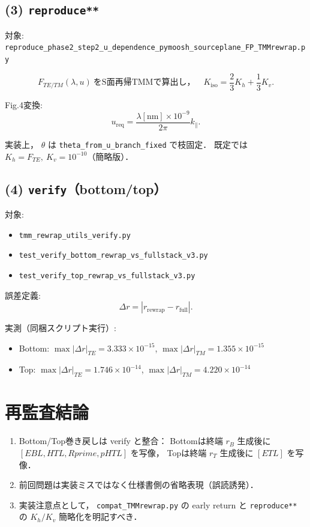 \documentclass[a4paper,11pt]{article}
\begin{document}
\subsection{(3) \texttt{reproduce**}}
対象:
\texttt{reproduce\_phase2\_step2\_u\_dependence\_pymoosh\_sourceplane\_FP\_TMMrewrap.py}

\[
F_{TE/TM}(\lambda,u)\ \text{をS面再帰TMMで算出し，}
\quad K_{\mathrm{iso}}=\frac{2}{3}K_h+\frac{1}{3}K_v.
\]

Fig.4変換:
\[
u_{\mathrm{req}}=
\frac{\lambda[\mathrm{nm}]\times 10^{-9}}{2\pi}k_\parallel.
\]

実装上，
\(\theta\) は \texttt{theta\_from\_u\_branch\_fixed} で枝固定．
既定では \(K_h=F_{TE},\ K_v=10^{-10}\)（簡略版）．

\subsection{(4) \texttt{verify}（bottom/top）}
対象:
\begin{itemize}[leftmargin=1.5em]
\item \texttt{tmm\_rewrap\_utils\_verify.py}
\item \texttt{test\_verify\_bottom\_rewrap\_vs\_fullstack\_v3.py}
\item \texttt{test\_verify\_top\_rewrap\_vs\_fullstack\_v3.py}
\end{itemize}

誤差定義:
\[
\Delta r=|r_{\mathrm{rewrap}}-r_{\mathrm{full}}|.
\]

実測（同梱スクリプト実行）:
\begin{itemize}[leftmargin=1.5em]
\item Bottom: \(\max|\Delta r|_{TE}=3.333\times10^{-15}\), \(\max|\Delta r|_{TM}=1.355\times10^{-15}\)
\item Top: \(\max|\Delta r|_{TE}=1.746\times10^{-14}\), \(\max|\Delta r|_{TM}=4.220\times10^{-14}\)
\end{itemize}

\section{再監査結論}
\begin{enumerate}[leftmargin=1.8em]
\item Bottom/Top巻き戻しは verify と整合：
Bottomは終端 \(r_B\) 生成後に \([EBL,HTL,Rprime,pHTL]\) を写像，
Topは終端 \(r_T\) 生成後に \([ETL]\) を写像．
\item 前回問題は実装ミスではなく仕様書側の省略表現（誤読誘発）．
\item 実装注意点として，
\texttt{compat\_TMMrewrap.py} の early return と
\texttt{reproduce**} の \(K_h/K_v\) 簡略化を明記すべき．
\end{enumerate}
\end{document}
